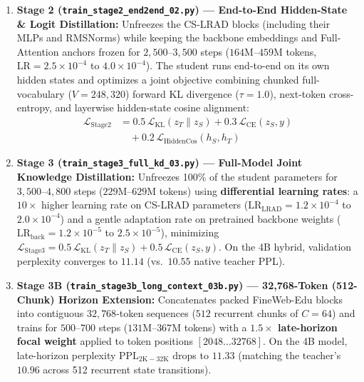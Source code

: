 \documentclass[twocolumn,10pt]{article}
\begin{document}
\begin{enumerate}
    \item \textbf{Stage 2 (\texttt{train\_stage2\_end2end\_02.py}) --- End-to-End Hidden-State \& Logit Distillation:}
    Unfreezes the CS-LRAD blocks (including their MLPs and RMSNorms) while keeping the backbone embeddings and Full-Attention anchors frozen for $2,500$--$3,500$ steps ($164\text{M}$--$459\text{M}$ tokens, $\text{LR} = 2.5\times 10^{-4}$ to $4.0\times 10^{-4}$). The student runs end-to-end on its own hidden states and optimizes a joint objective combining chunked full-vocabulary ($V=248,320$) forward KL divergence ($\tau=1.0$), next-token cross-entropy, and layerwise hidden-state cosine alignment:
    \begin{align}
    \mathcal{L}_{\text{Stage2}} &= 0.5 \, \mathcal{L}_{\text{KL}}(z_T \| z_S) + 0.3 \, \mathcal{L}_{\text{CE}}(z_S, y) \nonumber \\
    &\quad + 0.2 \, \mathcal{L}_{\text{HiddenCos}}(h_S, h_T)
    \end{align}

    \item \textbf{Stage 3 (\texttt{train\_stage3\_full\_kd\_03.py}) --- Full-Model Joint Knowledge Distillation:}
    Unfreezes 100\% of the student parameters for $3,500$--$4,800$ steps ($229\text{M}$--$629\text{M}$ tokens) using \textbf{differential learning rates}: a $10\times$ higher learning rate on CS-LRAD parameters ($\text{LR}_{\text{LRAD}} = 1.2\times 10^{-4}$ to $2.0\times 10^{-4}$) and a gentle adaptation rate on pretrained backbone weights ($\text{LR}_{\text{back}} = 1.2\times 10^{-5}$ to $2.5\times 10^{-5}$), minimizing $\mathcal{L}_{\text{Stage3}} = 0.5\,\mathcal{L}_{\text{KL}}(z_T \| z_S) + 0.5\,\mathcal{L}_{\text{CE}}(z_S, y)$. On the 4B hybrid, validation perplexity converges to $11.14$ (vs.\ $10.55$ native teacher PPL).

    \item \textbf{Stage 3B (\texttt{train\_stage3b\_long\_context\_03b.py}) --- 32,768-Token (512-Chunk) Horizon Extension:}
    Concatenates packed FineWeb-Edu blocks into contiguous $32,768$-token sequences ($512$ recurrent chunks of $C=64$) and trains for $500$--$700$ steps ($131\text{M}$--$367\text{M}$ tokens) with a \textbf{$1.5\times$ late-horizon focal weight} applied to token positions $[2048 \dots 32768]$. On the 4B model, late-horizon perplexity $\text{PPL}_{2\text{K}-32\text{K}}$ drops to $11.33$ (matching the teacher's $10.96$ across 512 recurrent state transitions).


\end{enumerate}
\end{document}
